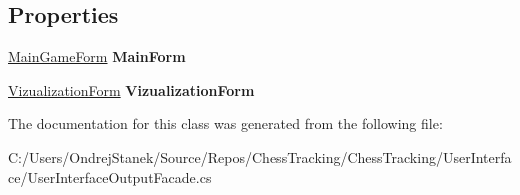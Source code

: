 \subsection*{Properties}
\begin{DoxyCompactItemize}
\item 
\mbox{\label{class_chess_tracking_1_1_user_interface_1_1_user_interface_output_facade_ab74dea5f3c913ae3d4d3284ee792a3c7}} 
\mbox{\hyperlink{class_chess_tracking_1_1_user_interface_1_1_main_game_form}{Main\+Game\+Form}} {\bfseries Main\+Form}
\item 
\mbox{\label{class_chess_tracking_1_1_user_interface_1_1_user_interface_output_facade_abbcde5fa8818efd4e6932a5d9530e2db}} 
\mbox{\hyperlink{class_chess_tracking_1_1_user_interface_1_1_vizualization_form}{Vizualization\+Form}} {\bfseries Vizualization\+Form}
\end{DoxyCompactItemize}


The documentation for this class was generated from the following file\+:\begin{DoxyCompactItemize}
\item 
C\+:/\+Users/\+Ondrej\+Stanek/\+Source/\+Repos/\+Chess\+Tracking/\+Chess\+Tracking/\+User\+Interface/User\+Interface\+Output\+Facade.\+cs\end{DoxyCompactItemize}

